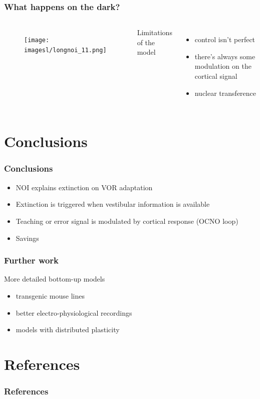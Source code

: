 \documentclass[10pt, compress]{beamer}
\begin{document}
\begin{frame}[fragile]
  \frametitle{What happens on the dark?}
  \begin{columns}[onlytextwidth]
      \begin{figure}
        \texttt{[image: imagesl/longnoi\_11.png]}
      \end{figure}
    Limitations of the model
    \begin{itemize}
      \item control isn't perfect
      \item there's always some modulation on the cortical signal
      \item nuclear transference
    \end{itemize}
  \end{columns}
\end{frame}

\section{Conclusions}

\begin{frame}[fragile]
  \frametitle{Conclusions}
  \begin{itemize}
    \item NOI explains extinction on VOR adaptation
    \item Extinction is triggered when vestibular information is available
    \item Teaching or error signal is modulated by cortical response (OCNO loop)
    \item Savings
  \end{itemize}
\end{frame}

\begin{frame}[fragile]
  \frametitle{Further work}
  More detailed bottom-up models
  \begin{itemize}
    \item transgenic mouse lines
    \item better electro-physiological recordings
    \item models with distributed plasticity
  \end{itemize}
\end{frame}

\section{References}

\begin{frame}[fragile]
  \frametitle{References}
  
\end{frame}

\end{document}
